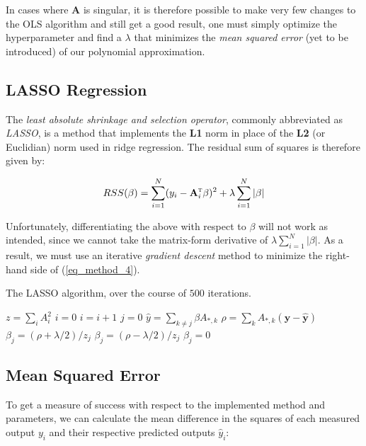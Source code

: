\documentclass[a4paper,10pt,english]{article}
\begin{document}
In cases where $\mathbf{A}$ is singular, it is therefore possible to make very few changes to the OLS algorithm and still get a good result, one must simply optimize the hyperparameter and find a $\lambda$ that minimizes the \textit{mean squared error} (yet to be introduced) of our polynomial approximation.

\subsection{LASSO Regression}

The \textit{least absolute shrinkage and selection operator}, commonly abbreviated as \textit{LASSO}, is a method that implements the \textbf{L1} norm in place of the \textbf{L2} (or Euclidian) norm used in ridge regression.  The residual sum of squares is therefore given by:

\begin{equation}
\label{eq_method_4}
RSS(\beta) = \sum_{i=1}^N (y_i - \mathbf{A}_i^\textsc{t} \beta)^2 + \lambda \sum_{i=1}^N |\beta|
\end{equation}

Unfortunately, differentiating the above with respect to $\beta$ will not work as intended, since we cannot take the matrix-form derivative of $\lambda \sum_{i=1}^N |\beta|$.  As a result, we must use an iterative \textit{gradient descent} method to minimize the right-hand side of (\ref{eq_method_4}).

\begin{algorithm}[H]
	\caption{The LASSO algorithm, over the course of $500$ iterations.}
	\begin{algorithmic}[1]
		\State $z = \sum_i A_i^2$
		\State $i = 0$
		\State $i = i + 1$
		\State $j = 0$
		\State $\hat{y} = \sum_{k \neq j} \beta A_{*,k}$
		\State $\rho = \sum_k A_{*,k} (\mathbf{y} - \mathbf{\hat{y}})$
		\State $\beta_j = (\rho + \lambda/2)/z_j$
		\State $\beta_j = (\rho - \lambda/2)/z_j$
		\Else
		\State $\beta_j = 0$
		\EndIf
		\EndWhile		
		\EndWhile
	\end{algorithmic}
\end{algorithm}

\subsection{Mean Squared Error}

To get a measure of success with respect to the implemented method and parameters, we can calculate the mean difference in the squares of each measured output $y_i$ and their respective predicted outputs $\hat{y}_i$:
\end{document}
